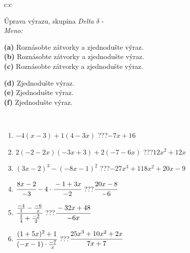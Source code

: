 \documentclass[10pt]{report}
\begin{document}
\newpage
\thispagestyle{empty}
\begin{tabular}{c:c}
\begin{minipage}[c][104.5mm][t]{0.5\linewidth}
\begin{center}
\vspace{7mm}
{\huge Úprava výrazu, skupina \textit{Delta $\delta$} -}\\[5mm]
\textit{Meno:}\phantom{xxxxxxxxxxxxxxxxxxxxxxxxxxxxxxxxxxxxxxxxxxxxxxxxxxxxxxxxxxxxxxxxx}\\[5mm]
\begin{minipage}{0.95\linewidth}
\begin{center}
{\small \begin{minipage}{0.6\textwidth}
\textbf{(a)} Roznásobte zátvorky a zjednodušte výraz. \\[1mm]
\textbf{(b)} Roznásobte zátvorky a zjednodušte výraz. \\[1mm]
\textbf{(c)} Roznásobte zátvorky a zjednodušte výraz.
\end{minipage} \begin{minipage}{0.39\textwidth}
\textbf{(d)} Zjednodušte výraz. \\[1mm]
\textbf{(e)} Zjednodušte výraz. \\[1mm]
\textbf{(f)} Zjednodušte výraz.
\end{minipage}
}
\end{center}
\end{minipage}
\\[4mm]
\begin{minipage}{0.79\linewidth}
\begin{center}
\begin{varwidth}{\linewidth}
\begin{enumerate}
\normalsize
\item $-4(x-3)+1(4-3x)$\quad \dotfill\; ???\;\dotfill \quad $-7x+16$
\item $2(-2-2x)(-3x+3)+2(-7-6x)$\quad \dotfill\; ???\;\dotfill \quad $12x^2+12x$
\item $(3x-2)^3-(-8x-1)^2$\quad \dotfill\; ???\;\dotfill \quad $-27x^3+118x^2+20x-9$
\item $\cfrac{8x-2}{-3}-4\cdot\cfrac{-1+3x}{-2}$\quad \dotfill\; ???\;\dotfill \quad $\cfrac{20x-8}{-6}$
\item $\cfrac{\frac{-4}{1}-\frac{-6}{x}}{\frac{1}{4}+\frac{-2}{2}}$\quad \dotfill\; ???\;\dotfill \quad $\cfrac{-32x+48}{-6x}$
\item $\cfrac{(1+5x)^2+1}{(-x-1)\cdot\frac{-7}{x}}$\quad \dotfill\; ???\;\dotfill \quad $\cfrac{25x^3+10x^2+2x}{7x+7}$

\end{enumerate}
\end{varwidth}
\end{center}
\end{minipage}
\end{center}
\end{minipage}
\end{tabular}
\end{document}
